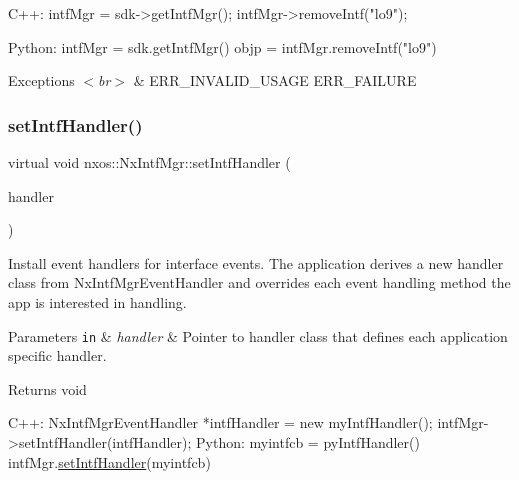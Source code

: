 \begin{DoxyCode}
C++:
   intfMgr = sdk->getIntfMgr();
   intfMgr->removeIntf(\textcolor{stringliteral}{"lo9"});

Python:
   intfMgr = sdk.getIntfMgr()
   objp = intfMgr.removeIntf(\textcolor{stringliteral}{"lo9"})
\end{DoxyCode}



\begin{DoxyExceptions}{Exceptions}
{\em $<$br$>$} & E\+R\+R\+\_\+\+I\+N\+V\+A\+L\+I\+D\+\_\+\+U\+S\+A\+GE E\+R\+R\+\_\+\+F\+A\+I\+L\+U\+RE \\
\hline
\end{DoxyExceptions}
\mbox{\label{classnxos_1_1_nx_intf_mgr_a9a8927131c8edd906ff035a2bbbe0eb0}} 
\subsubsection{\texorpdfstring{set\+Intf\+Handler()}{setIntfHandler()}}
{\footnotesize\ttfamily virtual void nxos\+::\+Nx\+Intf\+Mgr\+::set\+Intf\+Handler (\begin{DoxyParamCaption}\item[{\mbox{\hyperlink{classnxos_1_1_nx_intf_mgr_handler}{Nx\+Intf\+Mgr\+Handler}} $\ast$}]{handler }\end{DoxyParamCaption})\hspace{0.3cm}{\ttfamily [pure virtual]}}

Install event handlers for interface events. The application derives a new handler class from Nx\+Intf\+Mgr\+Event\+Handler and overrides each event handling method the app is interested in handling.


\begin{DoxyParams}[1]{Parameters}
\mbox{\tt in}  & {\em handler} & Pointer to handler class that defines each application specific handler. \\
\hline
\end{DoxyParams}
\begin{DoxyReturn}{Returns}
void
\end{DoxyReturn}

\begin{DoxyCode}
C++:
       NxIntfMgrEventHandler *intfHandler = \textcolor{keyword}{new} myIntfHandler();
       intfMgr->setIntfHandler(intfHandler);     
Python:
       myintfcb = pyIntfHandler()
       intfMgr.\mbox{\hyperlink{classnxos_1_1_nx_intf_mgr_a9a8927131c8edd906ff035a2bbbe0eb0}{setIntfHandler}}(myintfcb)
\end{DoxyCode}



